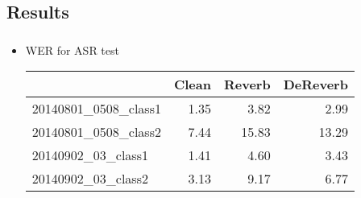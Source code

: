 \documentclass{beamer}
\begin{document}
\subsection{Results}
\frame
{
  \frametitle{\subsecname}
  
   \begin{itemize}
     \item WER for ASR test
        
        \begin{tabular}{l|r|r|r}
                                                      &   Clean    &    Reverb   &  DeReverb \\
           \hline
           \hline
           20140801\_0508\_class1    &   1.35       &    3.82       &   2.99 \\
           
           20140801\_0508\_class2    &   7.44       &    15.83     &   13.29 \\
           
           20140902\_03\_class1        &   1.41       &    4.60       &   3.43 \\
           
           20140902\_03\_class2        &   3.13       &    9.17       &   6.77 \\
        \end{tabular}
        
  \end{itemize}
}
\end{document}
